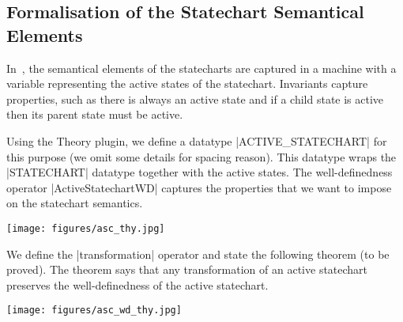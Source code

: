 \subsection{Formalisation of the Statechart Semantical Elements}
In~\cite{DBLP:conf/ictac/WrightHSB23}, the semantical elements of the statecharts are captured in a machine with a variable representing the active states of the statechart. Invariants capture properties, such as there is always an active state and if a child state is active then its parent state must be active.

Using the Theory plugin, we define a datatype |ACTIVE_STATECHART| for this purpose (we omit some details for spacing reason). This datatype wraps the |STATECHART| datatype together with the active states. The well-definedness operator |ActiveStatechartWD| captures the properties that we want to impose on the statechart semantics.
\begin{center}
    \texttt{[image: figures/asc\_thy.jpg]}
\end{center}
We define the |transformation| operator and state the following theorem (to be proved). The theorem says that any transformation of an active statechart preserves the well-definedness of the active statechart.
\begin{center}
    \texttt{[image: figures/asc\_wd\_thy.jpg]}
\end{center}
